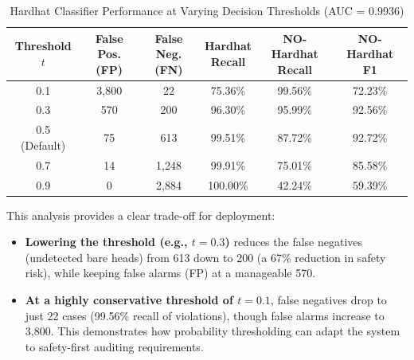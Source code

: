 \documentclass[11pt,a4paper]{article}
\begin{document}
\begin{table}[H]
\centering
\caption{Hardhat Classifier Performance at Varying Decision Thresholds (AUC = 0.9936)}
\label{tab:threshold_analysis}
\begin{tabular}{@{}cccccc@{}}
\toprule
\shortstack[c]{\textbf{Threshold}\\$t$} & \shortstack[c]{\textbf{False Pos.}\\\textbf{(FP)}} & \shortstack[c]{\textbf{False Neg.}\\\textbf{(FN)}} & \shortstack[c]{\textbf{Hardhat}\\\textbf{Recall}} & \shortstack[c]{\textbf{NO-Hardhat}\\\textbf{Recall}} & \shortstack[c]{\textbf{NO-Hardhat}\\\textbf{F1}} \\ \midrule
0.1                    & 3,800                         & 22                            & 75.36\%                 & 99.56\%                    & 72.23\%                \\
0.3                    & 570                           & 200                           & 96.30\%                 & 95.99\%                    & 92.56\%                \\
0.5 (Default)          & 75                            & 613                           & 99.51\%                 & 87.72\%                    & 92.72\%                \\
0.7                    & 14                            & 1,248                          & 99.91\%                 & 75.01\%                    & 85.58\%                \\
0.9                    & 0                             & 2,884                          & 100.00\%                & 42.24\%                    & 59.39\%                \\ \bottomrule
\end{tabular}
\end{table}

This analysis provides a clear trade-off for deployment:
\begin{itemize}
\item \textbf{Lowering the threshold (e.g., $t=0.3$)} reduces the false negatives (undetected bare heads) from 613 down to 200 (a 67\% reduction in safety risk), while keeping false alarms (FP) at a manageable 570.
\item \textbf{At a highly conservative threshold of $t=0.1$}, false negatives drop to just 22 cases (99.56\% recall of violations), though false alarms increase to 3,800. This demonstrates how probability thresholding can adapt the system to safety-first auditing requirements.
\end{itemize}
\end{document}
